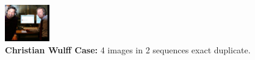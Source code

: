 \documentclass{acm_proc_article-sp}
\newcommand{\thumbheight}{16mm}
\newenvironment{thumbsequence}{}{\makebox[4mm]{}}
\begin{document}
\begin{figure}
\begin{centering}
\begin{thumbsequence}
		\includegraphics[height=\thumbheight]{resources/wulff/exactduplicate4.jpg}
	\end{thumbsequence}
	\caption{\textbf{Christian Wulff Case:} 4 images in 2 sequences exact duplicate.}
	\label{fig:wulff}
\end{centering}
\end{figure}
\end{document}
